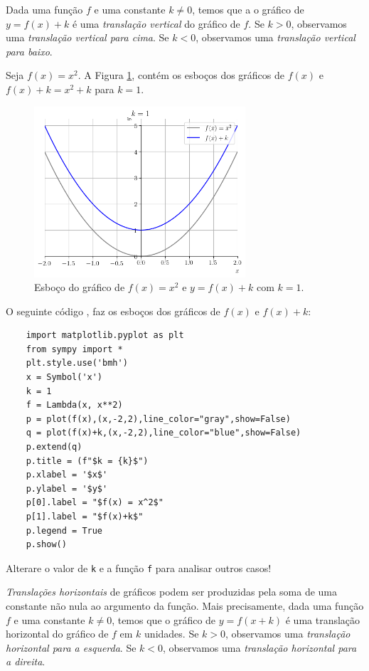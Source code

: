 Dada uma função $f$ e uma constante $k\neq 0$, temos que a o gráfico de $y = f(x) + k$ é uma \emph{translação vertical} do gráfico de $f$. Se $k>0$, observamos uma \emph{translação vertical para cima}. Se $k<0$, observamos uma \emph{translação vertical para baixo}.

\begin{ex}
  Seja $f(x) = x^2$. A Figura \ref{fig:ex_trans_vert}, contém os esboços dos gráficos de $f(x)$ e $f(x)+k = x^2+k$ para $k=1$.

  \begin{figure}[H]
    \centering
    \includegraphics[width=0.7\textwidth]{./cap_funcao/dados/fig_ex_transvert/fig_ex_transvert}
    \caption{Esboço do gráfico de $f(x) = x^2$ e $y=f(x)+k$ com $k=1$.}
    \label{fig:ex_trans_vert}
  \end{figure}

  \ifispython
  O seguinte código {\python}, faz os esboços dos gráficos de $f(x)$ e $f(x)+k$:
  \begin{lstlisting}
    import matplotlib.pyplot as plt
    from sympy import *
    plt.style.use('bmh')
    x = Symbol('x')
    k = 1
    f = Lambda(x, x**2)
    p = plot(f(x),(x,-2,2),line_color="gray",show=False)
    q = plot(f(x)+k,(x,-2,2),line_color="blue",show=False)
    p.extend(q)
    p.title = (f"$k = {k}$")
    p.xlabel = '$x$'
    p.ylabel = '$y$'
    p[0].label = "$f(x) = x^2$"
    p[1].label = "$f(x)+k$"
    p.legend = True
    p.show()
  \end{lstlisting}
  Alterare o valor de \verb+k+ e a função \verb+f+ para analisar outros casos!
  \fi
\end{ex}

\emph{Translações horizontais} de gráficos podem ser produzidas pela soma de uma constante não nula ao argumento da função. Mais precisamente, dada uma função $f$ e uma constante $k\neq 0$, temos que o gráfico de $y=f(x+k)$ é uma translação horizontal do gráfico de $f$ em $k$ unidades. Se $k>0$, observamos uma \emph{translação horizontal para a esquerda}. Se $k<0$, observamos uma \emph{translação horizontal para a direita}.

